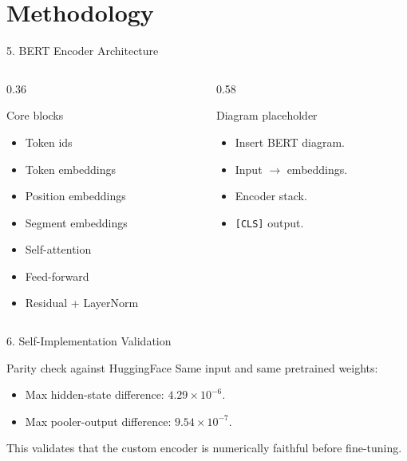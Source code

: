\documentclass[t, aspectratio=169]{beamer}
\begin{document}
\section{Methodology}

\begin{frame}{5. BERT Encoder Architecture}
    \begin{columns}[T]
        \begin{column}{0.36\textwidth}
            \begin{block}{Core blocks}
                \begin{itemize}
                    \item Token ids
                    \item Token embeddings
                    \item Position embeddings
                    \item Segment embeddings
                    \item Self-attention
                    \item Feed-forward
                    \item Residual + LayerNorm
                \end{itemize}
            \end{block}
        \end{column}
        \begin{column}{0.58\textwidth}
            \begin{alertblock}{Diagram placeholder}
                \begin{itemize}
                    \item Insert BERT diagram.
                    \item Input $\rightarrow$ embeddings.
                    \item Encoder stack.
                    \item \texttt{[CLS]} output.
                \end{itemize}
            \end{alertblock}
        \end{column}
    \end{columns}
\end{frame}

\begin{frame}{6. Self-Implementation Validation}
    \begin{block}{Parity check against HuggingFace}
        Same input and same pretrained weights:
        \begin{itemize}
            \item Max hidden-state difference: $4.29\times10^{-6}$.
            \item Max pooler-output difference: $9.54\times10^{-7}$.
        \end{itemize}
    \end{block}

    \vspace{0.6em}
    This validates that the custom encoder is numerically faithful before fine-tuning.
\end{frame}
\end{document}
